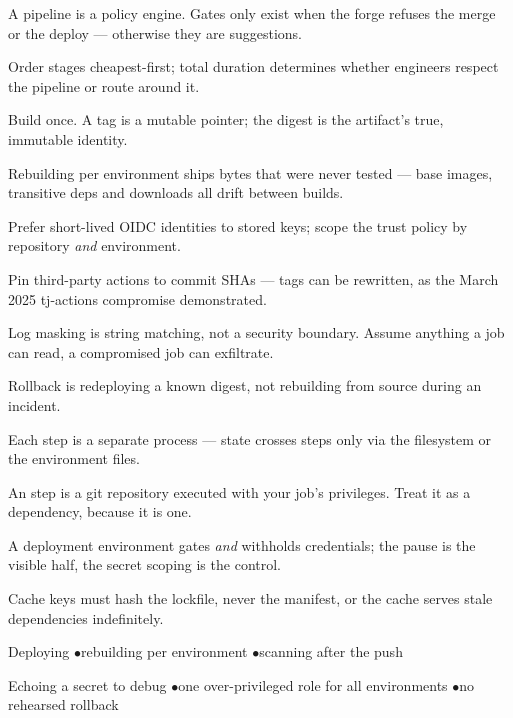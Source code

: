 
\begin{tickcheck}
  \item A pipeline is a policy engine. Gates only exist when the forge refuses the merge or the deploy --- otherwise they are suggestions.
  \item Order stages cheapest-first; total duration determines whether engineers respect the pipeline or route around it.
  \item Build once. A tag is a mutable pointer; the digest is the artifact's true, immutable identity.
  \item Rebuilding per environment ships bytes that were never tested --- base images, transitive deps and downloads all drift between builds.
  \item Prefer short-lived OIDC identities to stored keys; scope the trust policy by repository \emph{and} environment.
  \item Pin third-party actions to commit SHAs --- tags can be rewritten, as the March 2025 tj-actions compromise demonstrated.
  \item Log masking is string matching, not a security boundary. Assume anything a job can read, a compromised job can exfiltrate.
  \item Rollback is redeploying a known digest, not rebuilding from source during an incident.
\end{tickcheck}

\begin{wbitem}
  \item Each  step is a separate process --- state crosses steps only via the filesystem or the environment files.
  \item An  step is a git repository executed with your job's privileges. Treat it as a dependency, because it is one.
  \item A deployment environment gates \emph{and} withholds credentials; the pause is the visible half, the secret scoping is the control.
  \item Cache keys must hash the lockfile, never the manifest, or the cache serves stale dependencies indefinitely.
\end{wbitem}

\begin{wbitem}
  \item Deploying  \quad$\bullet$\quad rebuilding per environment \quad$\bullet$\quad scanning after the push
  \item Echoing a secret to debug \quad$\bullet$\quad one over-privileged role for all environments \quad$\bullet$\quad no rehearsed rollback
\end{wbitem}

